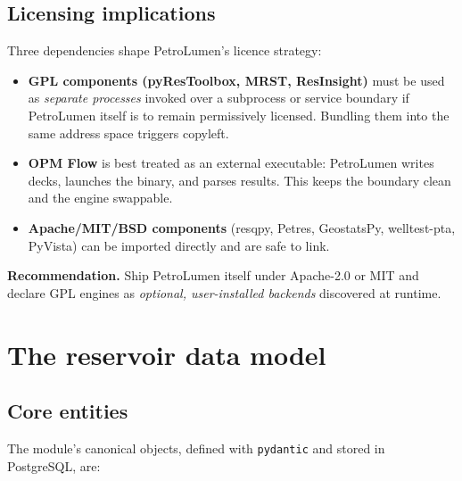 \documentclass[11pt,a4paper]{article}
\begin{document}
\subsection{Licensing implications}
Three dependencies shape PetroLumen's licence strategy:
\begin{itemize}[leftmargin=1.4em]
  \item \textbf{GPL components (pyResToolbox, MRST, ResInsight)} must be used
        as \emph{separate processes} invoked over a subprocess or service
        boundary if PetroLumen itself is to remain permissively licensed.
        Bundling them into the same address space triggers copyleft.
  \item \textbf{OPM Flow} is best treated as an external executable: PetroLumen
        writes decks, launches the binary, and parses results. This keeps the
        boundary clean and the engine swappable.
  \item \textbf{Apache/MIT/BSD components} (resqpy, Petres, GeostatsPy,
        welltest-pta, PyVista) can be imported directly and are safe to link.
\end{itemize}

\noindent\textbf{Recommendation.} Ship PetroLumen itself under Apache-2.0 or MIT
and declare GPL engines as \emph{optional, user-installed backends} discovered
at runtime.

\section{The reservoir data model}

\subsection{Core entities}
The module's canonical objects, defined with \texttt{pydantic} and stored in
PostgreSQL, are:
\end{document}
